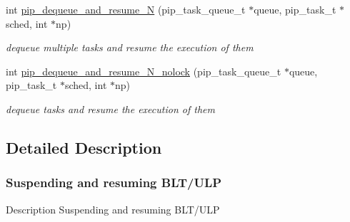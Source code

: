 \begin{DoxyCompactItemize}
int \hyperlink{group__ulp-2-suspension_gac26e54557d8e89fcdcb52a9df6c65998}{pip\-\_\-dequeue\-\_\-and\-\_\-resume\-\_\-\-N} (pip\-\_\-task\-\_\-queue\-\_\-t $\ast$queue, pip\-\_\-task\-\_\-t $\ast$sched, int $\ast$np)
\begin{DoxyCompactList}\small\item\em dequeue multiple tasks and resume the execution of them \end{DoxyCompactList}\item 
int \hyperlink{group__ulp-2-suspension_ga939e70924803be491c2f6f10b364e803}{pip\-\_\-dequeue\-\_\-and\-\_\-resume\-\_\-\-N\-\_\-nolock} (pip\-\_\-task\-\_\-queue\-\_\-t $\ast$queue, pip\-\_\-task\-\_\-t $\ast$sched, int $\ast$np)
\begin{DoxyCompactList}\small\item\em dequeue tasks and resume the execution of them \end{DoxyCompactList}\end{DoxyCompactItemize}


\subsection{Detailed Description}
\hypertarget{ulp-suspension}{}\subsubsection{Suspending and resuming B\-L\-T/\-U\-L\-P}\label{ulp-suspension}
\begin{DoxyParagraph}{Description}
Suspending and resuming B\-L\-T/\-U\-L\-P 
\end{DoxyParagraph}


